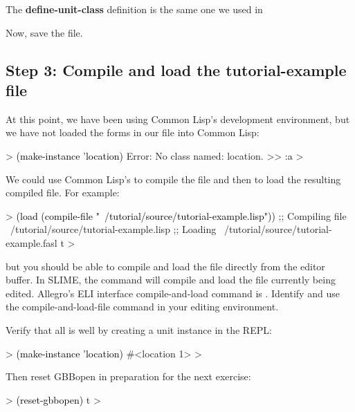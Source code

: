\documentclass[10pt,twoside,english,pdftex]{article}
\begin{document}
The \textbf{define-unit-class} definition is the same one we used in
  

Now, save the file.  

\subsection*{Step 3: Compile and load the tutorial-example file}

At this point, we have been using Common Lisp's
development environment, but we have not loaded the forms in our file
into Common Lisp:
%
\begin{example}\color{darkergray}%
  > \textcolor{black}{(make-instance 'location)}
  Error: No class named: location.
  >> \textcolor{black}{:a}
  >
\end{example}

We could use Common Lisp's  to compile the file and
then  to load the resulting compiled file. For example:
%
\begin{example}\color{darkergray}%
  > \textcolor{black}{(load (compile-file "~/tutorial/source/tutorial-example.lisp"))}
  ;; Compiling file ~/tutorial/source/tutorial-example.lisp
  ;; Loading ~/tutorial/source/tutorial-example.fasl
  t
  >
\end{example}
%
but you should be able to compile and load the file directly from the
editor buffer.  In SLIME, the command  will compile and
load the file currently being edited.  Allegro's ELI interface
compile-and-load command is .  Identify and use the
compile-and-load-file command in your editing environment.

Verify that all is well by creating a  unit instance in
the REPL:
%
\begin{example}\color{darkergray}%
  > \textcolor{black}{(make-instance 'location)}
  #<location 1>
  >
\end{example}

%
Then reset GBBopen in preparation for the next exercise:
%
\begin{example}\color{darkergray}%
  > \textcolor{black}{(reset-gbbopen)}
  t
  >
\end{example}


\T\markright{}%
\T\pagestyle{plain}
\T\cleardoublepage
\W{}
\T\pagestyle{fancy}
\T\thispagestyle{fancybottom}
\T\renewcommand{\headrulewidth}{0pt}
\end{document}
